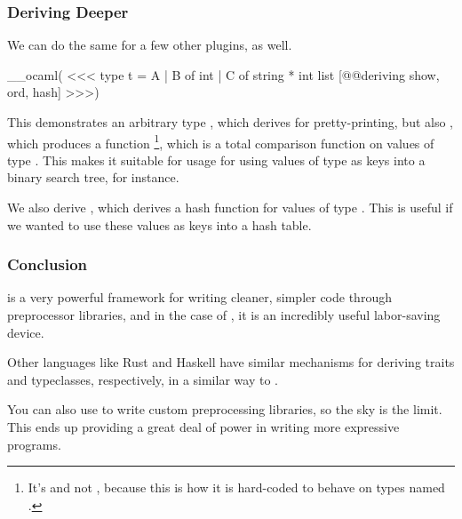 \documentclass[aspectratio=169, handout]{beamer}
\begin{document}
\begin{frame}[fragile]
  \frametitle{Deriving Deeper}

  We can do the same for a few other plugins, as well.

  \vspace{\fill}

__ocaml(
<<<
  type t = A | B of int | C of string * int list
    [@@deriving show, ord, hash]
>>>)

  \vspace{\fill}

  This demonstrates an arbitrary type , which derives  for
  pretty-printing, but also , which produces a function 
  \footnote{It's  and not , because this is how it
  is hard-coded to behave on types named .}, which is a total comparison
  function on values of type . This makes it suitable for usage for
  using values of type  as keys into a binary search tree, for instance.

  \vspace{\fill}

  We also derive , which derives a hash function for values of type
  . This is useful if we wanted to use these values as keys into a
  hash table.
\end{frame}

\begin{frame}[fragile]
  \frametitle{Conclusion}

   is a very powerful framework for writing cleaner, simpler code
  through preprocessor libraries, and in the case of , it
  is an incredibly useful labor-saving device.

  \vspace{\fill}

  Other languages like Rust and Haskell have similar mechanisms for deriving
  traits and typeclasses, respectively, in a similar way to .

  \vspace{\fill}

  You can also use  to write custom preprocessing libraries, so
  the sky is the limit. This ends up providing a great deal of power in writing
  more expressive programs.

\end{frame}

\end{document}
